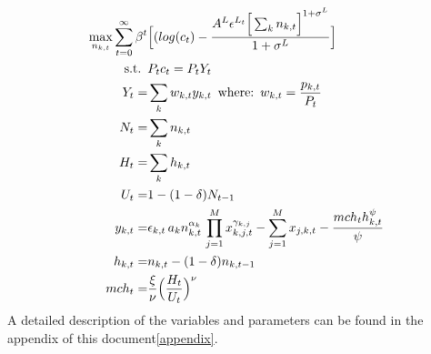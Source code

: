 \begin{align}
\underset{n_{k,t}}{\max}  \sum_{t = 0}^{\infty} \beta^{t} &\Big[(log(c_{t}) - \frac{A^{L}\epsilon^{L_{t}}\Big[\sum_{k} n_{k,t}\Big]^{1 + \sigma^{L}}}{1 + \sigma^{L}} \Big] \\
\mbox{s.t.} \,\,\, &
P_{t}c_{t} = P_{t}Y_{t} \label{eq: Static market clearing} \\
Y_{t}=&  \sum_{k} w_{k,t} y_{k,t} \,\,\, \mbox{where:} \,\,\, w_{k,t}=\frac{p_{k,t}}{P_{t}}\label{eq: Total weighted Production} \\
\vspace{0.5cm}
N_{t} =& \sum_{k}  n_{k,t} \label{eq: Total hours of work} \\
H_{t} =&  \sum_{k}  h_{k,t} \label{eq: Total hiring}\\
U_{t} =& 1-(1-\delta)N_{t-1}\\
y_{k,t} =& \epsilon_{k,t} \, a_{k} n_{k,t}^{\alpha_{k}} \, \prod_{j=1}^{M} x_{k,j,t}^{\gamma_{k,j}}-\sum_{j=1}^{M} x_{j,k,t} -\frac{mch_{t} h_{k,t}^{\psi}}{\psi} \label{eq:  Sectoral production function} \\
h_{k,t}=&n_{k,t}-(1-\delta)n_{k,t-1}\label{eq: Hiring law of motion}\\
mch_{t}=&\frac{\xi}{\nu}\Big(\frac{H_{t}}{U_{t}}\Big)^{\nu} \label{eq: Marginal Costs of Hiring}
\end{align}
A detailed description of the variables and parameters can be found in the appendix of this document\ref{appendix}.
